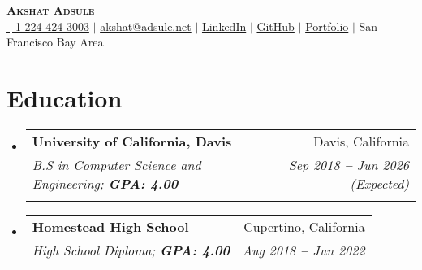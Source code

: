 \documentclass[letterpaper,12pt]{article}
\makeatletter
\newcommand{\resumeItem}[1]{
  \item\small{
    {#1 \vspace{-2pt}}
  }
}
\newcommand{\resumeSubheading}[4]{
  \vspace{-2pt}\item
    \begin{tabular*}{0.97\textwidth}[t]{l@{\extracolsep{\fill}}r}
      \textbf{#1} & #2 \\
      \textit{\small#3} & \textit{\small #4} \\
    \end{tabular*}\vspace{-7pt}
}
\newcommand{\resumeEducationHeading}[6]{
  \vspace{-2pt}\item
    \begin{tabular*}{0.97\textwidth}[t]{l@{\extracolsep{\fill}}r}
      \textbf{#1} & #2 \\
      \textit{\small#3} & \textit{\small #4} \\
      \textit{\small#5} & \textit{\small #6} \\
    \end{tabular*}\vspace{-5pt}
}
\newcommand{\resumeSubHeadingListStart}{\begin{itemize}[leftmargin=0.15in, label={}]}
\newcommand{\resumeSubHeadingListEnd}{\end{itemize}}
\newcommand{\resumeItemListStart}{\begin{itemize}}
\newcommand{\resumeItemListEnd}{\end{itemize}\vspace{-5pt}}
\makeatother
\begin{document}

\begin{center}
    \textbf{\Huge \scshape Akshat Adsule} \\ \vspace{3pt}
    \small
    \faMobile \hspace{.5pt} \href{tel:12244243003}{+1 224 424 3003}
    $|$
    \faAt \hspace{.5pt} \href{mailto:akshat@adsule.net}{akshat@adsule.net}
    $|$
    \faLinkedinSquare \hspace{.5pt} \href{https://www.linkedin.com/in/AkshatAdsule}{LinkedIn}
    $|$
    \faGithub \hspace{.5pt} \href{https://github.com/AkshatAdsule}{GitHub}
    $|$
    \faGlobe \hspace{.5pt} \href{https://drive.google.com/file/d/1SgYOPmmhMfv3nt2YYVv_pZNoxJ1BIq9P/view?usp=sharing}{Portfolio}
    $|$
    \faMapMarker \hspace{.5pt} San Francisco Bay Area
\end{center}




\section{Education}
  \vspace{3pt}
  \resumeSubHeadingListStart
    
    \resumeEducationHeading
      {University of California, Davis
      }{Davis, California}
      {B.S in Computer Science and Engineering;   \textbf{GPA: 4.00}}{Sep 2018 \textbf{--} Jun 2026 (Expected)} {}{}
      
    
    \resumeSubheading
      {Homestead High School
      }{Cupertino, California}
      {High School Diploma;   \textbf{GPA: 4.00}}{Aug 2018 \textbf{--} Jun 2022}
    
  \resumeSubHeadingListEnd
\end{document}
